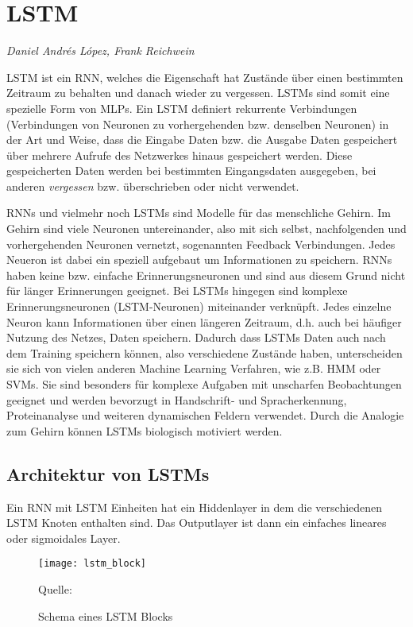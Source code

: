 \section{\acl{LSTM}}
\textit{Daniel Andrés López, Frank Reichwein}

\ac{LSTM} ist ein \ac{RNN}, welches die Eigenschaft hat Zustände über einen
bestimmten Zeitraum zu behalten und danach wieder zu vergessen. \acp{LSTM} sind
somit eine spezielle Form von \acp{MLP}. Ein \ac{LSTM} definiert rekurrente
Verbindungen (Verbindungen von Neuronen zu vorhergehenden bzw. denselben
Neuronen) in der Art und Weise, dass die Eingabe Daten bzw.
die Ausgabe Daten gespeichert über mehrere Aufrufe des Netzwerkes hinaus
gespeichert werden. Diese gespeicherten Daten werden bei bestimmten
Eingangsdaten ausgegeben, bei anderen \textit{vergessen} bzw. überschrieben oder
nicht verwendet. 
  
\acp{RNN} und vielmehr noch \acp{LSTM} sind Modelle für das menschliche Gehirn.
Im Gehirn sind viele Neuronen untereinander, also mit sich selbst, nachfolgenden
und vorhergehenden Neuronen vernetzt, sogenannten Feedback Verbindungen. Jedes
Neueron ist dabei ein speziell aufgebaut um Informationen zu speichern.
\acp{RNN} haben keine bzw. einfache Erinnerungsneuronen und sind aus diesem
Grund nicht für länger Erinnerungen geeignet. Bei \acp{LSTM} hingegen sind
komplexe Erinnerungsneuronen (\ac{LSTM}-Neuronen) miteinander verknüpft. Jedes
einzelne Neuron kann Informationen über einen längeren Zeitraum, d.h. auch bei
häufiger Nutzung des Netzes, Daten speichern. Dadurch dass \acp{LSTM} Daten auch
nach dem Training speichern können, also verschiedene Zustände haben,
unterscheiden sie sich von vielen anderen Machine Learning Verfahren, wie z.B.
\ac{HMM} oder \acp{SVM}. Sie sind besonders für komplexe Aufgaben mit unscharfen
Beobachtungen geeignet und werden bevorzugt in Handschrift- und Spracherkennung,
Proteinanalyse und weiteren dynamischen Feldern verwendet. Durch die Analogie
zum Gehirn können \acp{LSTM} biologisch motiviert werden.
 
\subsection{Architektur von \aclp{LSTM}}
Ein \ac{RNN} mit \ac{LSTM} Einheiten hat ein Hiddenlayer in dem die
verschiedenen \ac{LSTM} Knoten enthalten sind. Das Outputlayer ist dann ein
einfaches lineares oder sigmoidales Layer. 
 
\begin{figure}[htfp]
	\begin{center}
	\texttt{[image: lstm\_block]}
	\caption{Schema eines \acs{LSTM} Blocks}
	Quelle: \cite{WIKI2013}
	\label{fig:lstm_block}
	\end{center}
\end{figure}

